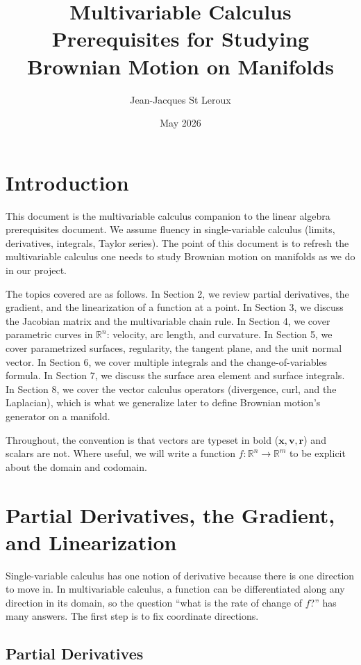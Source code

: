 \documentclass{article}
\title{Multivariable Calculus Prerequisites for Studying Brownian Motion on Manifolds}
\author{Jean-Jacques St Leroux}
\date{May 2026}
\begin{document}
\maketitle

\section{Introduction}

This document is the multivariable calculus companion to the linear algebra prerequisites document. We assume fluency in single-variable calculus (limits, derivatives, integrals, Taylor series). The point of this document is to refresh the multivariable calculus one needs to study Brownian motion on manifolds as we do in our project.

The topics covered are as follows. In Section 2, we review partial derivatives, the gradient, and the linearization of a function at a point. In Section 3, we discuss the Jacobian matrix and the multivariable chain rule. In Section 4, we cover parametric curves in $\mathbb{R}^n$: velocity, arc length, and curvature. In Section 5, we cover parametrized surfaces, regularity, the tangent plane, and the unit normal vector. In Section 6, we cover multiple integrals and the change-of-variables formula. In Section 7, we discuss the surface area element and surface integrals. In Section 8, we cover the vector calculus operators (divergence, curl, and the Laplacian), which is what we generalize later to define Brownian motion's generator on a manifold.

Throughout, the convention is that vectors are typeset in bold ($\mathbf{x}, \mathbf{v}, \mathbf{r}$) and scalars are not. Where useful, we will write a function $f: \mathbb{R}^n \to \mathbb{R}^m$ to be explicit about the domain and codomain.

\section{Partial Derivatives, the Gradient, and Linearization}

Single-variable calculus has one notion of derivative because there is one direction to move in. In multivariable calculus, a function can be differentiated along any direction in its domain, so the question ``what is the rate of change of $f$?'' has many answers. The first step is to fix coordinate directions.

\subsection{Partial Derivatives}
\end{document}
